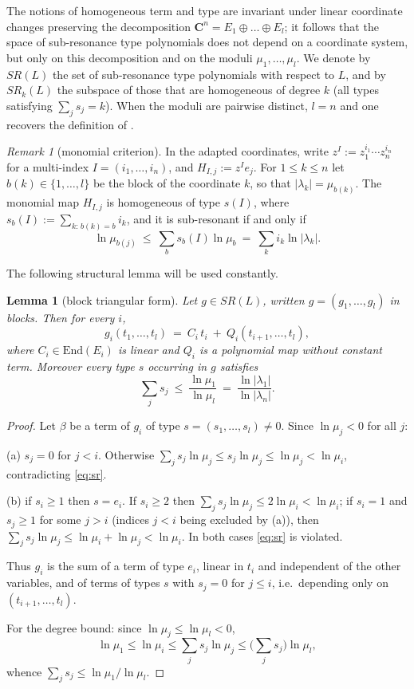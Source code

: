 \documentclass[english,11pt]{amsart}
\newtheorem{lemma}[theorem]{Lemma}
\theoremstyle{definition}
\theoremstyle{remark}
\newtheorem{remark}[theorem]{Remark}
\numberwithin{equation}{section}
\newcommand{\C}{\mathbf{C}}
\begin{document}
The notions of homogeneous term and type are invariant under linear coordinate changes preserving the decomposition $\C^n=E_1\oplus\dots\oplus E_l$; it follows that the space of sub-resonance type polynomials does not depend on a coordinate system, but only on this decomposition and on the moduli $\mu_1,\dots,\mu_l$. We denote by $SR(L)$ the set of sub-resonance type polynomials with respect to $L$, and by $SR_k(L)$ the subspace of those that are homogeneous of degree $k$ (all types satisfying $\sum_j s_j=k$). When the moduli are pairwise distinct, $l=n$ and one recovers the definition of \cite{Katok}.

\begin{remark}[monomial criterion]\label{r:monomial}
In the adapted coordinates, write $z^I:=z_1^{i_1}\cdots z_n^{i_n}$ for a multi-index $I=(i_1,\dots,i_n)$, and $H_{I,j}:=z^Ie_j$. For $1\le k\le n$ let $b(k)\in\{1,\dots,l\}$ be the block of the coordinate $k$, so that $|\lambda_k|=\mu_{b(k)}$. The monomial map $H_{I,j}$ is homogeneous of type $s(I)$, where $s_b(I):=\sum_{k:\,b(k)=b} i_k$, and it is sub-resonant if and only if
\[
\ln\mu_{b(j)}\ \le\ \sum_{b}s_b(I)\ln\mu_b\ =\ \sum_{k} i_k\ln|\lambda_k| .
\]
\end{remark}

The following structural lemma will be used constantly.

\begin{lemma}[block triangular form]\label{l:blocktriangular}
Let $g\in SR(L)$, written $g=(g_1,\dots,g_l)$ in blocks. Then for every $i$,
\[
g_i(t_1,\dots,t_l)\ =\ C_i\,t_i\ +\ Q_i(t_{i+1},\dots,t_l),
\]
where $C_i\in\mathrm{End}(E_i)$ is linear and $Q_i$ is a polynomial map without constant term. Moreover every type $s$ occurring in $g$ satisfies
\[
\sum_j s_j\ \le\ \frac{\ln\mu_1}{\ln\mu_l}\ =\ \frac{\ln|\lambda_1|}{\ln|\lambda_n|}.
\]
\end{lemma}

\begin{proof}
Let $\beta$ be a term of $g_i$ of type $s=(s_1,\dots,s_l)\neq 0$. Since $\ln\mu_j<0$ for all $j$:

(a) $s_j=0$ for $j<i$. Otherwise $\sum_j s_j\ln\mu_j\le s_j\ln\mu_j\le\ln\mu_j<\ln\mu_i$, contradicting \eqref{eq:sr}.

(b) if $s_i\ge1$ then $s=e_i$. If $s_i\ge2$ then $\sum_j s_j\ln\mu_j\le 2\ln\mu_i<\ln\mu_i$; if $s_i=1$ and $s_j\ge1$ for some $j>i$ (indices $j<i$ being excluded by (a)), then $\sum_j s_j\ln\mu_j\le \ln\mu_i+\ln\mu_j<\ln\mu_i$. In both cases \eqref{eq:sr} is violated.

Thus $g_i$ is the sum of a term of type $e_i$, linear in $t_i$ and independent of the other variables, and of terms of types $s$ with $s_j=0$ for $j\le i$, i.e.\ depending only on $(t_{i+1},\dots,t_l)$.

For the degree bound: since $\ln\mu_j\le\ln\mu_l<0$,
\[
\ln\mu_1\le\ln\mu_i\le\sum_j s_j\ln\mu_j\le\Big(\sum_j s_j\Big)\ln\mu_l,
\]
whence $\sum_j s_j\le \ln\mu_1/\ln\mu_l$.
\end{proof}
\end{document}
